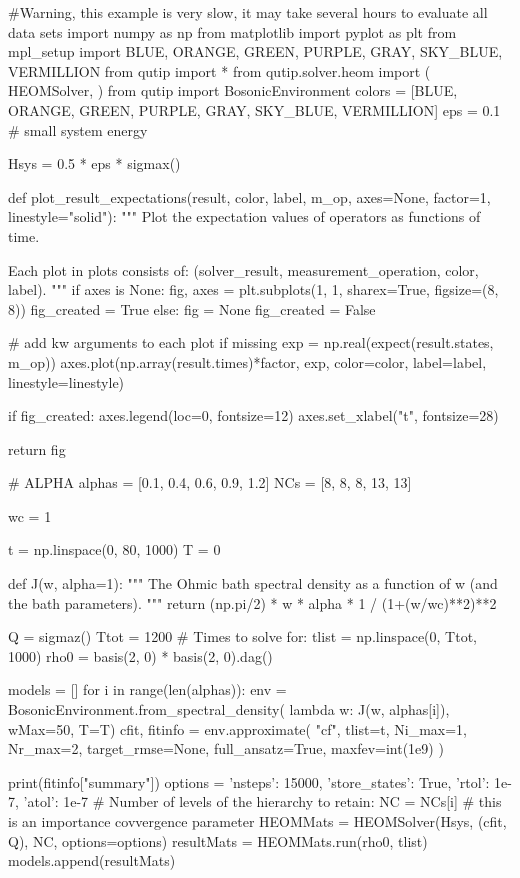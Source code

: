 #Warning, this example is very slow, it may take several hours to evaluate all data sets
import numpy as np
from matplotlib import pyplot as plt
from mpl_setup import BLUE, ORANGE, GREEN, PURPLE, GRAY, SKY_BLUE, VERMILLION
from qutip import *
from qutip.solver.heom import (
    HEOMSolver,
)
from qutip import BosonicEnvironment
colors = [BLUE, ORANGE, GREEN, PURPLE, GRAY, SKY_BLUE, VERMILLION]
eps = 0.1  # small system energy

Hsys = 0.5 * eps * sigmax()


def plot_result_expectations(result, color, label, m_op, axes=None, factor=1,
                             linestyle="solid"):
    """ Plot the expectation values of operators as functions of time.

        Each plot in plots consists of: (solver_result, measurement_operation,
        color, label).
    """
    if axes is None:
        fig, axes = plt.subplots(1, 1, sharex=True, figsize=(8, 8))
        fig_created = True
    else:
        fig = None
        fig_created = False

    # add kw arguments to each plot if missing
    exp = np.real(expect(result.states, m_op))
    axes.plot(np.array(result.times)*factor, exp, color=color, label=label,
              linestyle=linestyle)

    if fig_created:
        axes.legend(loc=0, fontsize=12)
        axes.set_xlabel("t", fontsize=28)

    return fig


# ALPHA
alphas = [0.1, 0.4, 0.6, 0.9, 1.2]
NCs = [8, 8, 8, 13, 13]

wc = 1

t = np.linspace(0, 80, 1000)
T = 0


def J(w, alpha=1):
    """ The Ohmic bath spectral density as a function
    of w (and the bath parameters). """
    return (np.pi/2) * w * alpha * 1 / (1+(w/wc)**2)**2


Q = sigmaz()
Ttot = 1200
# Times to solve for:
tlist = np.linspace(0, Ttot, 1000)
rho0 = basis(2, 0) * basis(2, 0).dag()

models = []
for i in range(len(alphas)):
    env = BosonicEnvironment.from_spectral_density(
        lambda w: J(w, alphas[i]), wMax=50, T=T)
    cfit, fitinfo = env.approximate(
       "cf", tlist=t, Ni_max=1, Nr_max=2, target_rmse=None, full_ansatz=True, maxfev=int(1e9)
    )
    
    print(fitinfo["summary"])
    options = {'nsteps': 15000, 'store_states': True,
                'rtol': 1e-7, 'atol': 1e-7}
    # Number of levels of the hierarchy to retain:
    NC = NCs[i]  # this is an importance covvergence parameter
    HEOMMats = HEOMSolver(Hsys, (cfit, Q), NC, options=options)
    resultMats = HEOMMats.run(rho0, tlist)
    models.append(resultMats)


